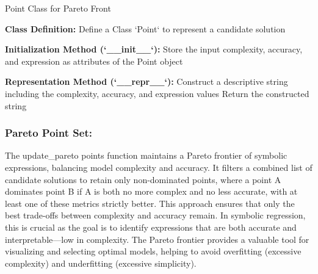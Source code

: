 \documentclass{article}
\begin{document}
\begin{algorithm}[H]
\SetAlgoLined %
\caption{Point Class for Pareto Front}
\label{alg:point_class} %

\textbf{Class Definition:}\;
Define a Class `Point` to represent a candidate solution\;

\textbf{Initialization Method (`__init__`):}\;
\;
Store the input complexity, accuracy, and expression as attributes of the Point object\;

\textbf{Representation Method (`__repr__`):}\;
\;
Construct a descriptive string including the complexity, accuracy, and expression values\;
Return the constructed string\;

\end{algorithm}



\subsubsection{Pareto Point Set:}


The update\_pareto points function maintains a Pareto frontier of symbolic expressions, balancing model complexity and accuracy. It filters a combined list of candidate solutions to retain only non-dominated points, where a point A dominates point B if A is both no more complex and no less accurate, with at least one of these metrics strictly better. This approach ensures that only the best trade-offs between complexity and accuracy remain. In symbolic regression, this is crucial as the goal is to identify expressions that are both accurate and interpretable—low in complexity. The Pareto frontier provides a valuable tool for visualizing and selecting optimal models, helping to avoid overfitting (excessive complexity) and underfitting (excessive simplicity).\\
\end{document}
